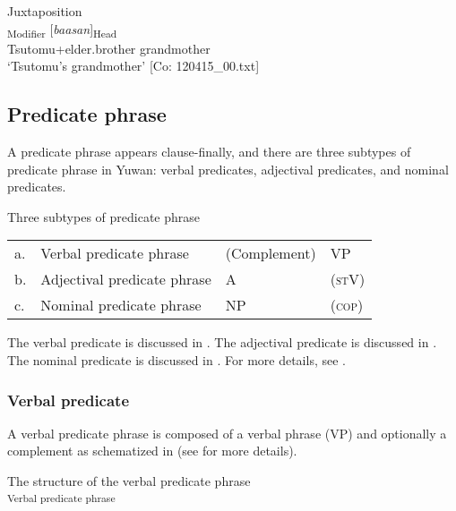 \ex\label{ex:4.3d} Juxtaposition\\
    \textsubscript{Modifier}  [\textit{baasan}]\textsubscript{Head}\\
      Tsutomu+elder.brother  grandmother\\
      \glt       ‘Tsutomu’s grandmother’ [Co: 120415\_00.txt]
\z
\z

\subsection{Predicate phrase}\label{sec:4.1.3}

A predicate phrase appears clause-finally, and there are three subtypes of predicate phrase in Yuwan: verbal predicates, adjectival predicates, and nominal predicates.

\ea Three subtypes of predicate phrase\\\label{ex:4.4}
\begin{tabular}{@{}l@{ }lll@{}}
  a. & Verbal predicate phrase     & (Complement) &  VP\footnotemark[1] \\
  b. & Adjectival predicate phrase &    A\footnotemark[2]         & (\textsc{st}V\footnotemark[3])\\
  c. & Nominal predicate phrase    &  NP          & (\textsc{cop}\footnotemark[4])\\
\end{tabular}
\z
{}

The verbal predicate is discussed in . The adjectival predicate is discussed in . The nominal predicate is discussed in . For more details, see .

\subsubsection{Verbal predicate}\label{sec:4.1.3.1}

A verbal predicate phrase is composed of a verbal phrase (VP) and optionally a complement as schematized in  (see  for more details).

\ea\label{ex:4.5}  The structure of the verbal predicate phrase\\\textsubscript{Verbal predicate phrase}
\z

